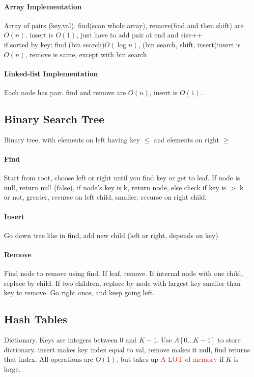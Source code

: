 \paragraph{Array Implementation}Array of pairs (key,val). find(scan whole array), remove(find and then shift) are $O(n)$. insert is $O(1)$, just have to add pair at end and size++
\\ if sorted by key: find (bin search)$O(\log n)$, (bin search, shift, insert)insert is $O(n)$, remove is same, except with bin search
\vspace{-7 pt}
\paragraph{Linked-list Implementation}Each node has pair. find and remove are $O(n)$, insert is $O(1)$.
\subsection{Binary Search Tree} Binary tree, with elements on left having key $\leq$ and elements on right $\geq$
\vspace{-7 pt}
\paragraph{Find} Start from root, choose left or right until you find key or get to leaf. If node is null, return null (false), if node's key is k, return node, else check if key is $>$ k or not, greater, recurse on left child, smaller, recurse on right child.
\vspace{-7 pt}
\paragraph{Insert} Go down tree like in find, add new child (left or right, depends on key)
\vspace{-7 pt}
\paragraph{Remove} Find node to remove using find. If leaf, remove. If internal node with one child, replace by child. If two children, replace by node with largest key smaller than key to remove. Go right once, and keep going left.
\subsection{Hash Tables}
Dictionary. Keys are integers between $0$ and $K-1$. Use $A[0\ldots K-1]$ to store dictionary. insert makes key index equal to val, remove makes it null, find returns that index. All operations are $O(1)$, but takes up \textcolor{Red}{A LOT of memory} if $K$ is large.
\vspace{-7 pt}

